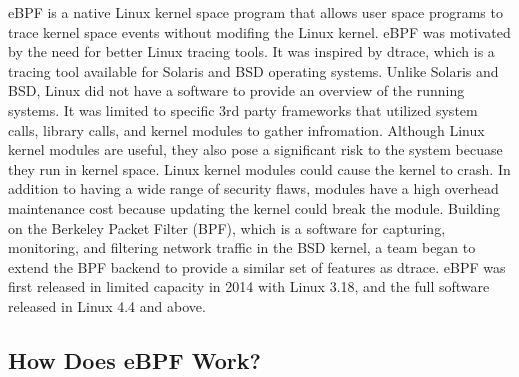 \documentclass{report}
\begin{document}
\begin{spacing}{1.5}
{\large
eBPF is a native Linux kernel space program that allows user space programs to trace kernel space events without modifing the Linux kernel. eBPF was motivated by the need for better Linux tracing tools. It was inspired by dtrace, which is a tracing tool available for Solaris and BSD operating systems. Unlike Solaris and BSD, Linux did not have a software to provide an overview of the running systems. It was limited to specific 3rd party frameworks that utilized system calls, library calls, and kernel modules to gather infromation. Although Linux kernel modules are useful, they also pose a significant risk to the system becuase they run in kernel space. Linux kernel modules could cause the kernel to crash. In addition to having a wide range of security flaws, modules have a high overhead maintenance cost because updating the kernel could break the module. Building on the Berkeley Packet Filter (BPF), which is a software for capturing, monitoring, and filtering network traffic in the BSD kernel, a team began to extend the BPF backend to provide a similar set of features as dtrace. eBPF was first released in limited capacity in 2014 with Linux 3.18, and the full software released in Linux 4.4 and above.
\newline
}

\subsection{How Does eBPF Work?}



\end{spacing}
\end{document}
